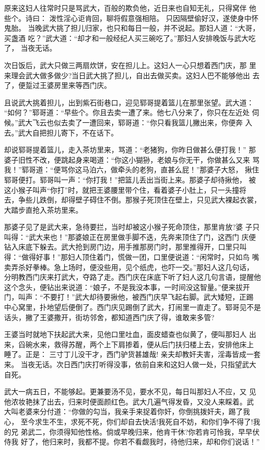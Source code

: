 原来这妇人往常时只是骂武大，百般的欺负他，近日来也自知无礼，只得窝伴
他些个。诗曰：
泼性淫心讵肯回，聊将假意强相陪。
只因隔壁偷好汉，遂使身中怀鬼胎。
当晚武大挑了担儿归家，也只和每日一般，并不说起。那妇人道：“大哥，买盏酒
吃？”武大道：“却才和一般经纪人买三碗吃了。”那妇人安排晚饭与武大吃了，
当夜无话。

次日饭后，武大只做三两扇炊饼，安在担儿上。这妇人一心只想着西门庆，那
里来理会武大做多做少?当日武大挑了担儿，自出去做买卖。这妇人巴不能够他出
去了，便踅过王婆房里来等西门庆。

且说武大挑着担儿，出到紫石街巷口，迎见郓哥提着篮儿在那里张望。武大道：
“如何？”郓哥道：“早些个。你且去卖一遭了来。他七八分来了，你只在左近处
伺候。”武大飞云也似去卖了一遭回来，郓哥道：“你只看我篮儿撇出来，你便奔
入去。”武大自把担儿寄下，不在话下。

却说郓哥提着篮儿，走入茶坊里来，骂道：“老猪狗，你昨日做甚么便打我！”
那婆子旧性不改，便跳起身来喝道：“你这小猢狲，老娘与你无干，你做甚么又来
骂我！”郓哥道：“便骂你这马泊六，做牵头的老狗，直甚么屁！”那婆子大怒，
揪住郓哥便打。郓哥叫一声：“你打我！”把篮儿丢出当街上来。那婆子却待揪他，
被这小猴子叫声“你打”时，就把王婆腰里带个住，看着婆子小肚上，只一头撞将
去，争些儿跌倒，却得壁子碍住不倒。那猴子死顶住在壁上，只见武大裸起衣裳，
大踏步直抢入茶坊里来。

那婆子见了是武大来，急待要拦，当时却被这小猴子死命顶住，那里肯放?婆
子只叫得：“武大来也！”那婆娘正在房里做手脚不迭，先奔来顶住了门，这西门
庆便钻入床底下躲去。武大抢到房门边，用手推那房门时，那里推得开，口里只叫
得：“做得好事！”那妇人顶住着门，慌做一团，口里便说道：“闲常时，只如鸟
嘴卖弄杀好拳棒。急上场时，便没些用，见个纸虎，也吓一交。”那妇人这几句话，
分明教西门庆来打武大，夺路了走。西门庆在床底下听了妇人这几句言语，提醒他
这个念头，便钻出来说道：“娘子，不是我没本事，一时间没这智量。”便来拔开
门，叫声：“不要打！”武大却待要揪他，被西门庆早飞起右脚。武大矮短，正踢
中心窝里，扑地望后便倒了。西门庆见踢倒了武大，打闹里一直走了。郓哥见不是
话头，撇了王婆撒开，街坊邻舍，都知道西门庆了得，谁敢来多管?

王婆当时就地下扶起武大来，见他口里吐血，面皮蜡查也似黄了，便叫那妇人
出来，舀碗水来，救得苏醒，两个上下肩掺着，便从后门扶归楼上去，安排他床上
睡了。正是：
三寸丁儿没干才，西门驴货甚雄哉!
亲夫却教奸夫害，淫毒皆成一套来。
当夜无话。次日西门庆打听得没事，依前自来和这妇人做一处，只指望武大自死。

武大一病五日，不能够起。更兼要汤不见，要水不见，每日叫那妇人不应，又
见他浓妆艳抹了出去，归来时便面颜红色。武大几遍气得发昏，又没人来睬着。武
大叫老婆来分付道：“你做的勾当，我亲手来捉着你奸，你倒挑拨奸夫，踢了我心，
至今求生不生，求死不死，你们却自去快活!我死自不妨，和你们争不得了!我的兄
弟武二，你须得知他性格。倘或早晚归来，他肯干休?你若肯可怜我，早早伏侍我
好了，他归来时，我都不提。你若不看觑我时，待他归来，却和你们说话！”

